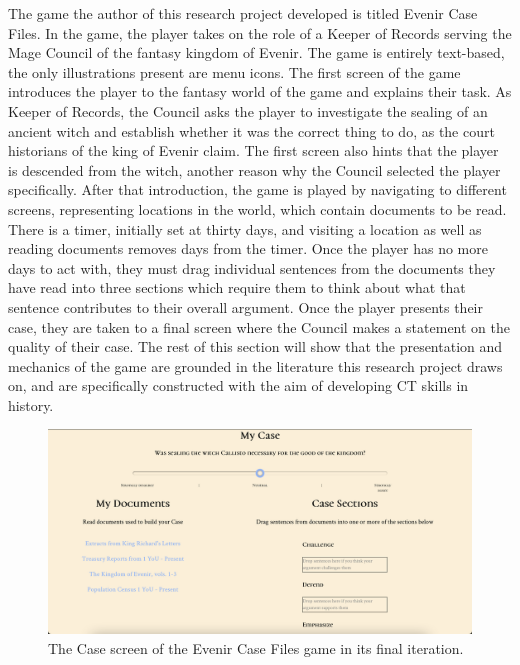 \documentclass{l4proj}
\begin{document}
The game the author of this research project developed is titled Evenir Case Files. In the game, the player takes on the role of a Keeper of Records serving the Mage Council of the fantasy kingdom of Evenir. The game is entirely text-based, the only illustrations present are menu icons. The first screen of the game introduces the player to the fantasy world of the game and explains their task. As Keeper of Records, the Council asks the player to investigate the sealing of an ancient witch and establish whether it was the correct thing to do, as the court historians of the king of Evenir claim. The first screen also hints that the player is descended from the witch, another reason why the Council selected the player specifically. After that introduction, the game is played by navigating to different screens, representing locations in the world, which contain documents to be read. There is a timer, initially set at thirty days, and visiting a location as well as reading documents removes days from the timer. Once the player has no more days to act with, they must drag individual sentences from the documents they have read into three sections which require them to think about what that sentence contributes to their overall argument. Once the player presents their case, they are taken to a final screen where the Council makes a statement on the quality of their case. The rest of this section will show that the presentation and mechanics of the game are grounded in the literature this research project draws on, and are specifically constructed with the aim of developing CT skills in history. 

\begin{figure}[htb]
    \centering
    \includegraphics[scale=0.25]{images/MyCase_Final.png}
    \caption{The Case screen of the Evenir Case Files game in its final iteration.}
    \label{fig:case_final}
\end{figure}
\end{document}
